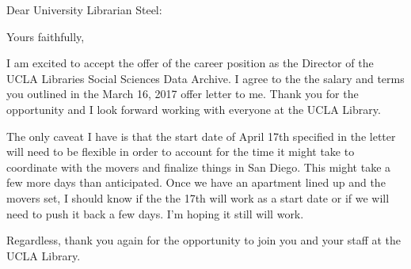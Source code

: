 \documentclass[11pt,letterpaper,sans]{moderncv}
\begin{document}
\date{\today}
\opening{Dear University Librarian Steel:}
\closing{Yours faithfully,}
\makelettertitle

I am excited to accept the offer of the career position as the Director of the UCLA Libraries Social Sciences Data Archive. I agree to the the salary and terms you outlined in the March 16, 2017 offer letter to me. Thank you for the opportunity and I look forward working with everyone at the UCLA Library.

The only caveat I have is that the start date of April 17th specified in the letter will need to be flexible in order to account for the time it might take to coordinate with the movers and finalize things in San Diego. This might take a few more days than anticipated. Once we have an apartment lined up and the movers set, I should know if the the 17th will work as a start date or if we will need to push it back a few days. I'm hoping it still will work.

Regardless, thank you again for the opportunity to join you and your staff at the UCLA Library.

\makeletterclosing
\fi
\end{document}
